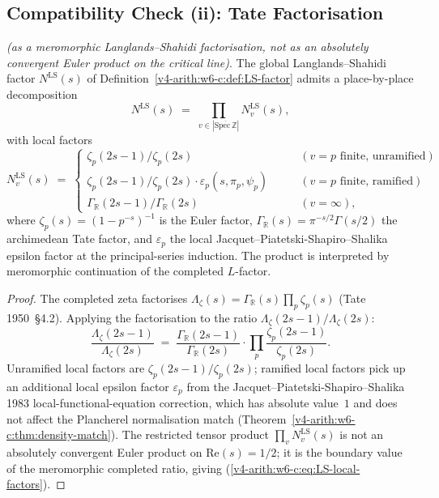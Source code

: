 \subsection{Compatibility Check (ii): Tate Factorisation}
\label{v4-arith:w6-c:LS:compat-tate}

\begin{proposition}
\label{v4-arith:w6-c:prop:tate-factorisation}
\emph{(as a meromorphic
Langlands--Shahidi factorisation, not as an absolutely convergent
Euler product on the critical line)}. The global Langlands--Shahidi factor
\(N^{\mathrm{LS}}(s)\) of Definition~\ref{v4-arith:w6-c:def:LS-factor} admits
a place-by-place decomposition
\begin{equation}
\label{v4-arith:w6-c:eq:LS-local-factors}
N^{\mathrm{LS}}(s)\;=\;\prod_{v\in|\overline{\mathrm{Spec}\,\mathbb{Z}}|}N^{\mathrm{LS}}_{v}(s),
\end{equation}
with local factors
\begin{equation}
\label{v4-arith:w6-c:eq:LS-local-factor-v}
N^{\mathrm{LS}}_{v}(s)\;=\;\begin{cases}
\zeta_{p}(2s-1)/\zeta_{p}(2s)\qquad&(v=p\text{ finite, unramified})\\
\zeta_{p}(2s-1)/\zeta_{p}(2s)\cdot\varepsilon_{p}(s,\pi_{p},\psi_{p})\qquad&(v=p\text{ finite, ramified})\\
\Gamma_{\mathbb{R}}(2s-1)/\Gamma_{\mathbb{R}}(2s)\qquad&(v=\infty),
\end{cases}
\end{equation}
where \(\zeta_{p}(s)=(1-p^{-s})^{-1}\) is the Euler factor,
\(\Gamma_{\mathbb{R}}(s)=\pi^{-s/2}\Gamma(s/2)\) the archimedean
Tate factor, and \(\varepsilon_{p}\) the local
Jacquet--Piatetski-Shapiro--Shalika epsilon factor at the
principal-series induction. The product is interpreted by
meromorphic continuation of the completed \(L\)-factor.
\end{proposition}

\begin{proof}
The completed zeta factorises
\(\Lambda_{\zeta}(s)=\Gamma_{\mathbb{R}}(s)\prod_{p}\zeta_{p}(s)\)
(Tate 1950~\S4.2). Applying the factorisation to the ratio
\(\Lambda_{\zeta}(2s-1)/\Lambda_{\zeta}(2s)\):
\begin{equation*}
\frac{\Lambda_{\zeta}(2s-1)}{\Lambda_{\zeta}(2s)}\;=\;\frac{\Gamma_{\mathbb{R}}(2s-1)}{\Gamma_{\mathbb{R}}(2s)}\cdot\prod_{p}\frac{\zeta_{p}(2s-1)}{\zeta_{p}(2s)}.
\end{equation*}
Unramified local factors are \(\zeta_{p}(2s-1)/\zeta_{p}(2s)\);
ramified local factors pick up an additional local epsilon factor
\(\varepsilon_{p}\) from the Jacquet--Piatetski-Shapiro--Shalika 1983
local-functional-equation correction, which has absolute
value~\(1\) and does not affect the Plancherel normalisation match
(Theorem~\ref{v4-arith:w6-c:thm:density-match}). The restricted tensor
product \(\prod_{v}N^{\mathrm{LS}}_{v}(s)\) is not an absolutely
convergent Euler product on \(\mathrm{Re}(s)=1/2\); it is the
boundary value of the meromorphic completed ratio, giving
(\ref{v4-arith:w6-c:eq:LS-local-factors}).
\end{proof}

